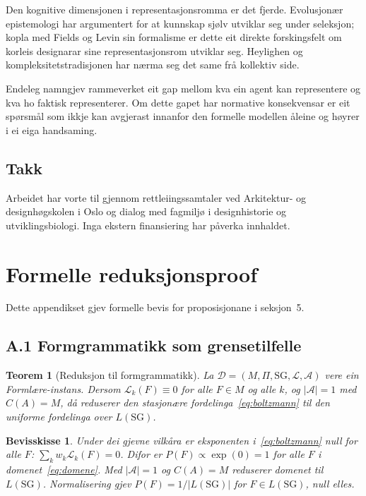 \documentclass[10pt,a4paper,twocolumn]{article}
\newtheorem{theorem}{Teorem}
\newtheorem*{proof*}{Bevisskisse}
\begin{document}
Den kognitive dimensjonen i representasjonsromma er det fjerde. Evolusjonær epistemologi \citep{campbell1974, popper1972} har argumentert for at kunnskap sjølv utviklar seg under seleksjon; kopla med Fields og Levin sin formalisme er dette eit direkte forskingsfelt om korleis designarar sine representasjonsrom utviklar seg. Heylighen \citeyearpar{heylighen2007} og kompleksitetstradisjonen har nærma seg det same frå kollektiv side.

Endeleg namngjev rammeverket eit gap mellom kva ein agent kan representere og kva ho faktisk representerer. Om dette gapet har normative konsekvensar er eit spørsmål som ikkje kan avgjerast innanfor den formelle modellen åleine og høyrer i ei eiga handsaming.

\subsection*{Takk}
Arbeidet har vorte til gjennom rettleiingssamtaler ved Arkitektur- og designhøgskolen i Oslo og dialog med fagmiljø i designhistorie og utviklingsbiologi. Inga ekstern finansiering har påverka innhaldet.



\appendix
\section{Formelle reduksjonsproof}

Dette appendikset gjev formelle bevis for proposisjonane i seksjon~5.

\subsection*{A.1 Formgrammatikk som grensetilfelle}

\begin{theorem}[Reduksjon til formgrammatikk]
La $\mathcal{D} = (M, \Pi, \mathrm{SG}, \mathcal{L}, \mathcal{A})$ vere ein Formlære-instans. Dersom $\mathcal{L}_k(F) \equiv 0$ for alle $F \in M$ og alle $k$, og $|\mathcal{A}| = 1$ med $C(A) = M$, då reduserer den stasjonære fordelinga~\ref{eq:boltzmann} til den uniforme fordelinga over $L(\mathrm{SG})$.
\end{theorem}

\begin{proof*}
Under dei gjevne vilkåra er eksponenten i~\ref{eq:boltzmann} null for alle $F$: $\sum_k w_k \mathcal{L}_k(F) = 0$. Difor er $P(F) \propto \exp(0) = 1$ for alle $F$ i domenet~\ref{eq:domene}. Med $|\mathcal{A}| = 1$ og $C(A) = M$ reduserer domenet til $L(\mathrm{SG})$. Normalisering gjev $P(F) = 1/|L(\mathrm{SG})|$ for $F \in L(\mathrm{SG})$, null elles.
\end{proof*}
\end{document}
